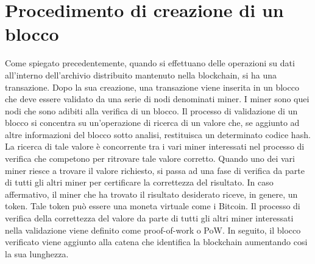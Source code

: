 \section{Procedimento di creazione di un blocco}
Come spiegato precedentemente, quando si effettuano delle operazioni su dati all'interno dell'archivio distribuito mantenuto nella blockchain, si ha una transazione. Dopo la sua creazione, una transazione viene inserita in un blocco che deve essere validato da una serie di nodi denominati miner. I miner sono quei nodi che sono adibiti alla verifica di un blocco. Il processo di validazione di un blocco si concentra su un'operazione di ricerca di un valore che, se aggiunto ad altre informazioni del blocco sotto analisi, restituisca un determinato codice hash. La ricerca di tale valore è concorrente tra i vari miner interessati nel processo di verifica che competono per ritrovare tale valore corretto. Quando uno dei vari miner riesce a trovare il valore richiesto, si passa ad una fase di verifica da parte di tutti gli altri miner per certificare la correttezza del risultato. In caso affermativo, il miner che ha trovato il risultato desiderato riceve, in genere, un token. Tale token può essere una moneta virtuale come i Bitcoin. Il processo di verifica della correttezza del valore da parte di tutti gli altri miner interessati nella validazione viene definito come proof-of-work o PoW. In seguito, il blocco verificato viene aggiunto alla catena che identifica la blockchain aumentando cosi la sua lunghezza.
\newpage
